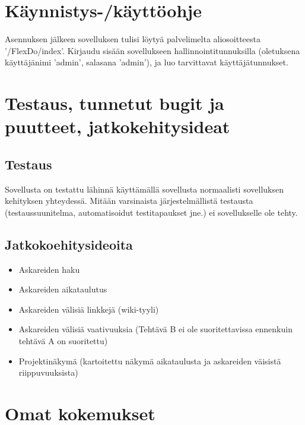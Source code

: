 ﻿\documentclass[finnish]{report}
\begin{document}
\chapter{Käynnistys-/käyttöohje}

Asennuksen jälkeen sovelluksen tulisi löytyä palvelimelta aliosoitteesta '/FlexDo/index'.
Kirjaudu sisään sovellukseen hallinnointitunnuksilla (oletuksena käyttäjänimi 'admin', salasana 'admin'), ja luo tarvittavat käyttäjätunnukset.


\chapter{Testaus, tunnetut bugit ja puutteet, jatkokehitysideat}

\section{Testaus}

Sovellusta on testattu lähinnä käyttämällä sovellusta normaalisti sovelluksen kehityksen yhteydessä. Mitään varsinaista järjestelmällistä testausta (testaussuunitelma, automatisoidut testitapaukset jne.) ei sovellukselle ole tehty.

\section{Jatkokoehitysideoita}

\begin{itemize}
  \item Askareiden haku
  \item Askareiden aikataulutus
  \item Askareiden välisiä linkkejä (wiki-tyyli)
  \item Askareiden välisiä vaativuuksia (Tehtävä B ei ole suoritettavissa ennenkuin tehtävä A on suoritettu)
  \item Projektinäkymä (kartoitettu näkymä aikataulusta ja askareiden väisistä riippuvuuksista)
\end{itemize}


\chapter{Omat kokemukset}
\end{document}
